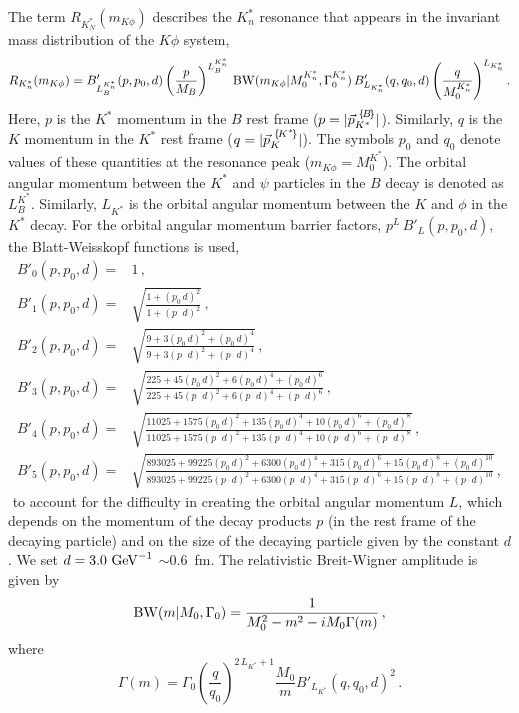 The term $R_{K^*_N}(m_{K\phi})$ describes the $K^*_n$ 
resonance that appears in the invariant mass distribution of the $K\phi$ system,
\begin{equation}
R_{K^*_n}(m_{K\phi}) =
B'_{L_{B}^{K^*_n}}(p,p_0,d) \left(\frac{p}{M_{B}}\right)^{L_{B}^{K^*_n}} \, 
{\rm BW}(m_{K\phi} | M_{0}^{K^*_n}, \Gamma_{0}^{K^*_n} ) \, 
B'_{L_{K^*_n}}(q,q_0,d) 
\left(\frac{q}{M_{0}^{K^*_n}}\right)^{L_{K^*_n}}.
\label{SUPeq:resshape}
\end{equation}
Here, $p$ is the $K^*$ momentum in the $B$ rest frame ($p=|{\vec{p}}_{{K^*}}^{\,\,\{\!B\!\}}|$).
Similarly, $q$ is the $K$ momentum in the $K^*$ rest frame ($q=|{\vec{p}}_{{K}}^{\,\,\{\!K^*\!\}}|$).
The symbols $p_0$ and $q_0$ denote values of these quantities at the resonance peak ($m_{K\phi}=M_0^{K^*}$). 
The orbital angular momentum between the $K^*$ and $\psi$ particles 
in the $B$ decay is denoted as $L_{B}^{K^*}$.
Similarly, $L_{K^*}$ is the orbital angular momentum between the $K$ and $\phi$ in the $K^*$ decay.
For the orbital angular momentum barrier factors, $p^L\,B'_{L}(p,p_0,d)$, 
the Blatt-Weisskopf functions \supercite{Blatt-Weisskopf-1979} is used,
{
\def\1{p\phantom{_0}}
\def\2{p_0}
\small
\begin{align}
\label{SUPeq:blattw}
B'_{0}(p,p_0,d)=&1 \,,\nonumber \\
B'_{1}(p,p_0,d)=&\sqrt{ \frac{1+(\2\,d)^2}{1+(\1\,d)^2} } \,,\nonumber \\
B'_{2}(p,p_0,d)=&\sqrt{ \frac{9+3(\2\,d)^2+(\2\,d)^4}{9+3(\1\,d)^2+(\1\,d)^4} } \,,\\
B'_{3}(p,p_0,d)=&\sqrt{ \frac{225+45(\2\,d)^2+6(\2\,d)^4+(\2\,d)^6}{225+45(\1\,d)^2+6(\1\,d)^4+(\1\,d)^6} } \,,\nonumber\\
B'_{4}(p,p_0,d)=&\sqrt{ \frac{11025+1575(\2\,d)^2+135(\2\,d)^4+10(\2\,d)^6+(\2\,d)^8}{11025+1575(\1\,d)^2+135(\1\,d)^4+10(\1\,d)^6+(\1\,d)^8} } \,,\nonumber \\
B'_{5}(p,p_0,d)=&\sqrt{ \frac{893025+99225(\2\,d)^2+6300(\2\,d)^4+315(\2\,d)^6+15(\2\,d)^8+(\2\,d)^{10}}{
                            893025+99225(\1  \,d)^2+6300(\1  \,d)^4+315(\1  \,d)^6+15(\1  \,d)^8+(\1  \,d)^{10}} } \,\nonumber,
\end{align}
}
$\!\!\!$ to account for the difficulty in creating the orbital angular momentum $L$, which depends on the momentum of 
the decay products $p$ (in the rest frame of the decaying particle) and on the size of the decaying particle 
given by the constant $d$. 
We set $d=3.0~{\rm GeV}^{-1}$ $\sim$0.6~fm.  
The relativistic Breit-Wigner amplitude is given by
\begin{equation}   
{\rm BW}(m | M_0, \Gamma_0 ) = \frac{1}{M_0^2-m^2 - i M_0 \Gamma(m)} \,,
\label{SUPeq:breitwigner}
\end{equation}
where
\begin{equation}   
\Gamma(m)=\Gamma_0 \left(\frac{q}{q_0}\right)^{2\,L_{K^*}+1} \frac{M_0}{m} B'_{L_{K^*}}(q,q_0,d)^2 \,.
\label{SUPeq:mwidth}
\end{equation}


